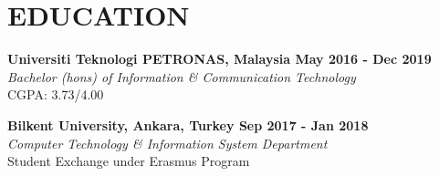 \vspace{0.3cm}
\section{EDUCATION}

\textbf{Universiti Teknologi PETRONAS, Malaysia
\hfill{May 2016 - Dec 2019}} \vspace{0.1cm} \\
{\sl Bachelor (hons) of Information \& Communication Technology} \vspace{0.1cm} \\
\hfill CGPA: 3.73/4.00

\textbf{Bilkent University, Ankara, Turkey
\hfill{Sep 2017 - Jan 2018}} \vspace{0.1cm} \\
{\sl Computer Technology \& Information System Department} \vspace{0.1cm} \\
\hfill Student Exchange under Erasmus Program \\

